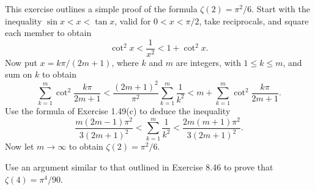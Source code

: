 \begin{problembox}
    This exercise outlines a simple proof of the formula \(\zeta(2) = \pi^2/6\). Start with the inequality \(\sin x < x < \tan x\), valid for \(0 < x < \pi/2\), take reciprocals, and square each member to obtain
    \[\cot^2 x < \frac{1}{x^2} < 1 + \cot^2 x.\]
    Now put \(x = k\pi/(2m + 1)\), where \(k\) and \(m\) are integers, with \(1 \leq k \leq m\), and sum on \(k\) to obtain
    \[\sum_{k=1}^{m} \cot^2 \frac{k\pi}{2m + 1} < \frac{(2m + 1)^2}{\pi^2} \sum_{k=1}^{m} \frac{1}{k^2} < m + \sum_{k=1}^{m} \cot^2 \frac{k\pi}{2m + 1}.\]
    Use the formula of Exercise 1.49(c) to deduce the inequality
    \[\frac{m(2m - 1)\pi^2}{3(2m + 1)^2} < \sum_{k=1}^m \frac{1}{k^2} < \frac{2m(m + 1)\pi^2}{3(2m + 1)^2}.\]
    Now let \(m \to \infty\) to obtain \(\zeta(2) = \pi^2/6\).
    \end{problembox}
    
    \begin{problembox}
    Use an argument similar to that outlined in Exercise 8.46 to prove that \(\zeta(4) = \pi^4/90\).
    \end{problembox}